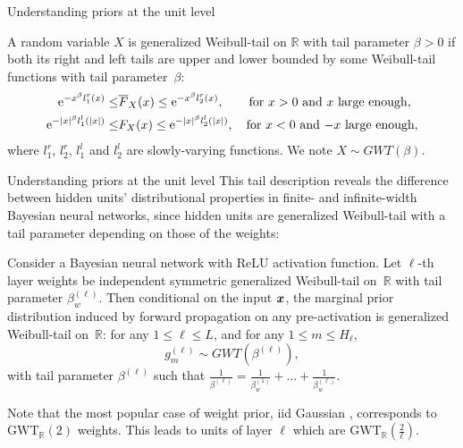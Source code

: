 \documentclass[9pt,handout]{beamer}
\begin{document}
\begin{frame}{Understanding priors at the unit level}
	\begin{definition}
\label{def:gen_weibull-tail_r}
A random variable $X$ is generalized Weibull-tail on $\mathbb{R}$ with tail parameter $\beta > 0$ if both its right and left tails are upper and lower bounded by some Weibull-tail functions with tail parameter~$\beta$:
\begin{align*}
    \mathrm{e}^{-x^{\beta} l_1^r(x)} \le & \overline{F}_X(x) \le \mathrm{e}^{-x^{\beta} l_2^r(x)}, \quad \ \ \ \text{for }x > 0 \text{ and $x$ large enough}, \\
    \mathrm{e}^{-|x|^{\beta} l_1^l(|x|)} \le & F_X(x) \le \mathrm{e}^{-|x|^{\beta} l_2^l(|x|)}, \quad \text{for } x < 0 \text{ and $-x$ large enough},
\end{align*}
where $l_1^r$, $l_2^r$, $l_1^l$ and $l_2^l$ are slowly-varying functions. 
We note $X \sim GWT(\beta)$. 
\end{definition}
\end{frame}

\begin{frame}{Understanding priors at the unit level}
This tail description reveals the difference between hidden units' distributional properties in finite- and infinite-width Bayesian neural networks, since 
hidden units are generalized Weibull-tail with a tail parameter depending on those of the weights:
\begin{theorem}
\label{theorem:hidden_units_are_gwt}
Consider a Bayesian neural network  with ReLU activation function. Let $\ell$-th layer weights be independent symmetric generalized Weibull-tail on~$\mathbb{R}$ with tail parameter $\beta^{(\ell)}_w$. 
Then conditional on the input $\boldsymbol{x}$, the marginal prior distribution induced by forward propagation on any pre-activation is generalized Weibull-tail on~$\mathbb{R}$: for any $1\leq \ell\leq L$, and for any $1\leq m\leq H_\ell$,
$$g_m^{(\ell)}\sim GWT(\beta^{(\ell)}),$$
with tail parameter $\beta^{(\ell)}$ such that $\frac{1}{\beta^{(\ell)}} = \frac{1}{\beta^{(1)}_w} + \dots + \frac{1}{\beta^{(\ell)}_w}$.
\end{theorem}
Note that the most popular case of weight prior, iid Gaussian \citep{neal1996bayesian}, corresponds to $\text{GWT}_{\mathbb{R}}(2)$ weights. This leads to units of layer $\ell$ which are $\text{GWT}_{\mathbb{R}}(\frac{2}{\ell})$. 
\end{frame}
\end{document}

